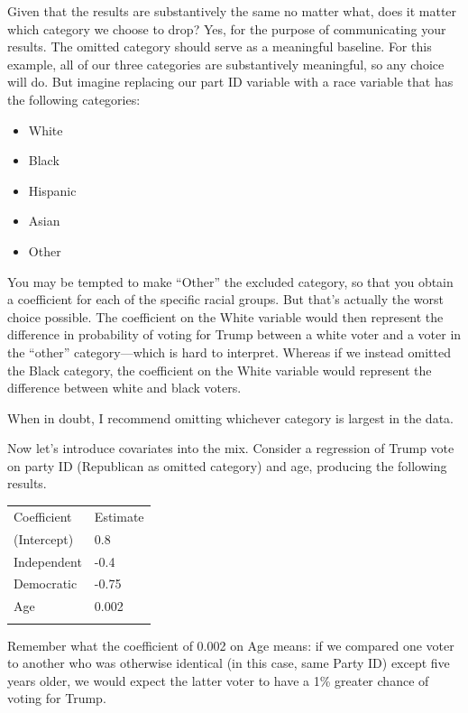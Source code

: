 \documentclass[
  12pt,
  oneside,openany]{book}
\providecommand{\tightlist}{%
  \setlength{\itemsep}{0pt}\setlength{\parskip}{0pt}}
\begin{document}
Given that the results are substantively the same no matter what, does it matter which category we choose to drop? Yes, for the purpose of communicating your results. The omitted category should serve as a meaningful baseline. For this example, all of our three categories are substantively meaningful, so any choice will do. But imagine replacing our part ID variable with a race variable that has the following categories:

\begin{itemize}
\tightlist
\item
  White
\item
  Black
\item
  Hispanic
\item
  Asian
\item
  Other
\end{itemize}

You may be tempted to make ``Other'' the excluded category, so that you obtain a coefficient for each of the specific racial groups. But that's actually the worst choice possible. The coefficient on the White variable would then represent the difference in probability of voting for Trump between a white voter and a voter in the ``other'' category---which is hard to interpret. Whereas if we instead omitted the Black category, the coefficient on the White variable would represent the difference between white and black voters.

When in doubt, I recommend omitting whichever category is largest in the data.

Now let's introduce covariates into the mix. Consider a regression of Trump vote on party ID (Republican as omitted category) and age, producing the following results.

\begin{longtable}[]{@{}ll@{}}
\toprule
Coefficient & Estimate \\ \addlinespace
\midrule
\endhead
(Intercept) & 0.8 \\ \addlinespace
Independent & -0.4 \\ \addlinespace
Democratic & -0.75 \\ \addlinespace
Age & 0.002 \\ \addlinespace
\bottomrule
\end{longtable}

Remember what the coefficient of 0.002 on Age means: if we compared one voter to another who was otherwise identical (in this case, same Party ID) except five years older, we would expect the latter voter to have a 1\% greater chance of voting for Trump.
\end{document}
